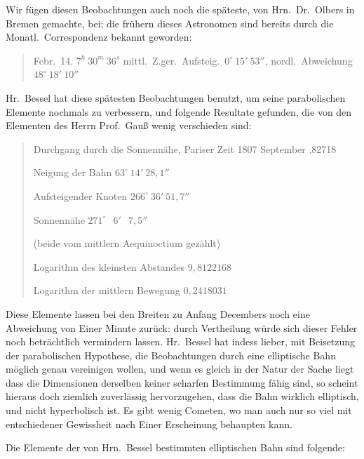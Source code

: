 \documentclass[12pt,a4paper]{book}
\begin{document}
Wir f\"ugen diesen Beobachtungen auch noch die sp\"ateste, von Hrn.~Dr.~Olbers in Bremen gemachte, bei; die fr\"uhern dieses Astronomen sind bereits durch die Monatl.~Correspondenz bekannt geworden:

\begin{quote}
Febr.~14. $7^{h}\ 30^{m}\ 36^{s}$ mittl.~Z.\quad ger.~Aufsteig.\ $0^{\circ}\ 15'\ 53''$, \quad nordl.~Abweichung\ $48^{\circ}\ 18'\ 10''$
\end{quote}

Hr.~Bessel hat diese sp\"atesten Beobachtungen benutzt, um seine parabolischen Elemente nochmals zu verbessern, und folgende Resultate gefunden, die von den Elementen des Herrn Prof.~Gau{\ss} wenig verschieden sind:

\begin{quote}
Durchgang durch die Sonnenn\"ahe, Pariser Zeit 1807 September ,82718

Neigung der Bahn \dotfill $63^{\circ}\ 14'\ 28{,}1''$

Aufsteigender Knoten \dotfill $266^{\circ}\ 36'\ 51{,}7''$

Sonnenn\"ahe \dotfill $271^{\circ}\ \phantom{0}6'\ \phantom{0}7{,}5''$

(beide vom mittlern Aequinoctium gez\"ahlt)

Logarithm des kleinsten Abstandes \dotfill $9{,}8122168$

Logarithm der mittlern Bewegung \dotfill $0{,}2418031$
\end{quote}

Diese Elemente lassen bei den Breiten zu Anfang Decembers noch eine Abweichung von Einer Minute zur\"uck: durch Vertheilung w\"urde sich dieser Fehler noch betr\"achtlich vermindern lassen. Hr.~Bessel hat indess lieber, mit Beisetzung der parabolischen Hypothese, die Beobachtungen durch eine elliptische Bahn m\"oglich genau vereinigen wollen, und wenn es gleich in der Natur der Sache liegt dass die Dimensionen derselben keiner scharfen Bestimmung f\"ahig sind, so scheint hieraus doch ziemlich zuverl\"assig hervorzugehen, dass die Bahn wirklich elliptisch, und nicht hyperbolisch ist. Es gibt wenig Cometen, wo man auch nur so viel mit entschiedener Gewissheit nach Einer Erscheinung behaupten kann.

Die Elemente der von Hrn.~Bessel bestimmten elliptischen Bahn sind folgende:
\end{document}
